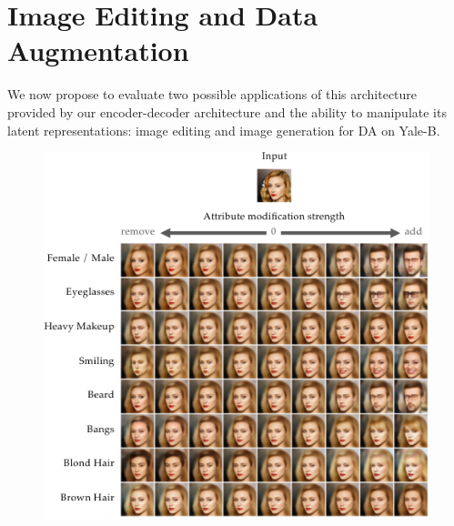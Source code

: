 \section{Image Editing and Data Augmentation}
\label{dualdis:sec:editing}

We now propose to evaluate two possible applications of this architecture provided by our encoder-decoder architecture and the ability to manipulate its latent representations: image editing and image generation for \acf{DA} on Yale-B.




\begin{figure}[tbp]
    \centering
    \includegraphics[width=\linewidth]{images/dualdis_celeba_linear.pdf}
    \label{dualdis:fig:celeba_linear}
\end{figure}
